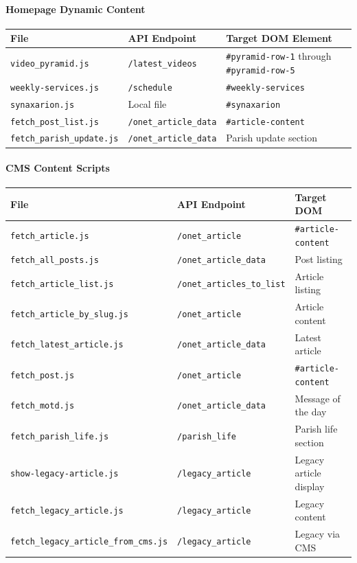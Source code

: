\documentclass[12pt]{article}
\begin{document}
\paragraph{Homepage Dynamic Content}

{\small
\begin{longtable}{p{4.5cm}p{3.5cm}p{4.5cm}}
\toprule
\textbf{File} & \textbf{API Endpoint} & \textbf{Target DOM Element} \\
\midrule
\texttt{video\_pyramid.js} & \texttt{/latest\_videos} & \texttt{\#pyramid-row-1} through \texttt{\#pyramid-row-5} \\
\texttt{weekly-services.js} & \texttt{/schedule} & \texttt{\#weekly-services} \\
\texttt{synaxarion.js} & Local file & \texttt{\#synaxarion} \\
\texttt{fetch\_post\_list.js} & \texttt{/onet\_article\_data} & \texttt{\#article-content} \\
\texttt{fetch\_parish\_update.js} & \texttt{/onet\_article\_data} & Parish update section \\
\bottomrule
\end{longtable}
}

\paragraph{CMS Content Scripts}

{\footnotesize
\begin{longtable}{lll}
\toprule
\textbf{File} & \textbf{API Endpoint} & \textbf{Target DOM} \\
\midrule
\texttt{fetch\_article.js} & \texttt{/onet\_article} & \texttt{\#article-content} \\
\texttt{fetch\_all\_posts.js} & \texttt{/onet\_article\_data} & Post listing \\
\texttt{fetch\_article\_list.js} & \texttt{/onet\_articles\_to\_list} & Article listing \\
\texttt{fetch\_article\_by\_slug.js} & \texttt{/onet\_article} & Article content \\
\texttt{fetch\_latest\_article.js} & \texttt{/onet\_article\_data} & Latest article \\
\texttt{fetch\_post.js} & \texttt{/onet\_article} & \texttt{\#article-content} \\
\texttt{fetch\_motd.js} & \texttt{/onet\_article\_data} & Message of the day \\
\texttt{fetch\_parish\_life.js} & \texttt{/parish\_life} & Parish life section \\
\texttt{show-legacy-article.js} & \texttt{/legacy\_article} & Legacy article display \\
\texttt{fetch\_legacy\_article.js} & \texttt{/legacy\_article} & Legacy content \\
{\footnotesize\texttt{fetch\_legacy\_article\_from\_cms.js}} & \texttt{/legacy\_article} & Legacy via CMS \\
\bottomrule
\end{longtable}
}
\end{document}
